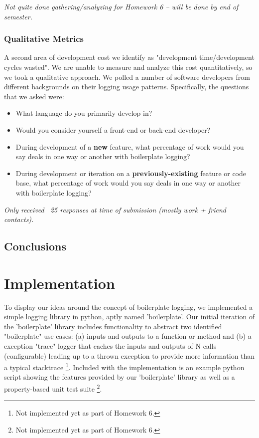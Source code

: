 \documentclass[acmsmall,review,authorversion]{acmart}
\begin{document}
\textit{Not quite done gathering/analyzing for Homework 6 -- will be done by end of semester.}

\subsubsection{Qualitative Metrics}

A second area of development cost we identify as "development time/development cycles wasted". We are unable to measure and analyze this cost quantitatively, so we took a qualitative approach. We polled a number of software developers from different backgrounds on their logging usage patterns. Specifically, the questions that we asked were:

\begin{itemize}
    \item What language do you primarily develop in?
    \item Would you consider yourself a front-end or back-end developer?
    \item During development of a \textbf{new} feature, what percentage of work would you say deals in one way or another with boilerplate logging?
    \item During development or iteration on a \textbf{previously-existing} feature or code base, what percentage of work would you say deals in one way or another with boilerplate logging?
\end{itemize}

\textit{Only received ~25 responses at time of submission (mostly work + friend contacts).}

\subsection{Conclusions}

\section{Implementation}

To display our ideas around the concept of boilerplate logging, we implemented a simple logging library in python, aptly named 'boilerplate'. Our initial iteration of the 'boilerplate' library includes functionality to abstract two identified "boilerplate" use cases: (a) inputs and outputs to a function or method and (b) a exception "trace" logger that caches the inputs and outputs of N calls (configurable) leading up to a thrown exception to provide more information than a typical stacktrace \footnote{Not implemented yet as part of Homework 6.}. Included with the implementation is an example python script showing the features provided by our 'boilerplate' library as well as a property-based unit test suite \footnote{Not implemented yet as part of Homework 6.}.
\end{document}
